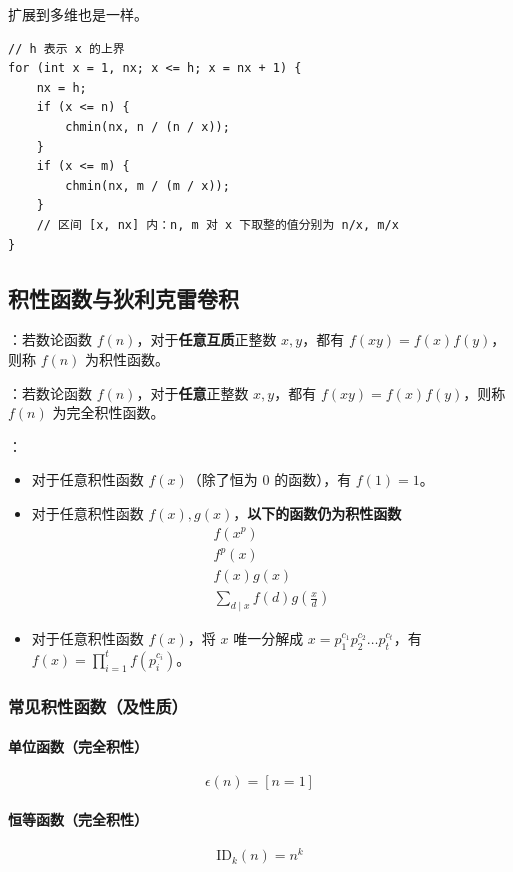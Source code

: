扩展到多维也是一样。

\begin{verbatim}
// h 表示 x 的上界
for (int x = 1, nx; x <= h; x = nx + 1) {
    nx = h;
    if (x <= n) {
        chmin(nx, n / (n / x));
    }
    if (x <= m) {
        chmin(nx, m / (m / x));
    }
    // 区间 [x, nx] 内：n, m 对 x 下取整的值分别为 n/x, m/x
}
\end{verbatim}

\subsection{积性函数与狄利克雷卷积}

：若数论函数 $f(n)$，对于\textbf{任意互质}正整数 $x, y$，都有 $f(xy) = f(x)f(y)$，则称 $f(n)$ 为积性函数。

：若数论函数 $f(n)$，对于\textbf{任意}正整数 $x, y$，都有 $f(xy) = f(x)f(y)$，则称 $f(n)$ 为完全积性函数。

：

\begin{itemize}
    \item 对于任意积性函数 $f(x)$（除了恒为 $0$ 的函数），有 $f(1) = 1$。
    \item 对于任意积性函数 $f(x), g(x)$，\textbf{以下的函数仍为积性函数}
    \[
    \begin{gathered}
    f(x^p) \\
    f^p(x) \\
    f(x)g(x) \\
    \sum_{d \mid x} f(d)g\left( \frac{x}{d} \right)
    \end{gathered}
    \]

    \item 对于任意积性函数 $f(x)$，将 $x$ 唯一分解成 $x = p_1^{c_1}p_2^{c_2}\dots p_t^{c_t}$，有 $f(x) = \prod_{i = 1}^t f(p_i^{c_i})$。
\end{itemize}

\subsubsection{常见积性函数（及性质）}

\paragraph{单位函数（完全积性）}
\[
\epsilon(n) = [n = 1]
\]

\paragraph{恒等函数（完全积性）}
\[
\mathrm{ID}_k(n) = n^k
\]

